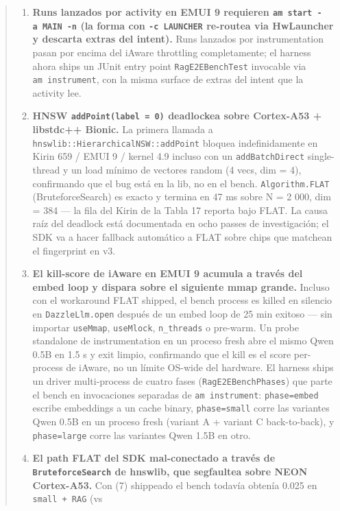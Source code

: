 \begin{quote}
\begin{enumerate}
  re-\texttt{notify} heartbeat de 4 s es el workaround diagnosticado.
\item
  \textbf{Runs lanzados por activity en EMUI 9 requieren
  \texttt{am\ start\ -a\ MAIN\ -n} (la forma con \texttt{-c\ LAUNCHER} re-routea
  via HwLauncher y descarta extras del intent).} Runs lanzados por
  instrumentation pasan por encima del iAware throttling completamente; el
  harness ahora ships un JUnit entry point \texttt{RagE2EBenchTest} invocable
  via \texttt{am\ instrument}, con la misma surface de extras del intent que la
  activity lee.
\item
  \textbf{HNSW \texttt{addPoint(label\ =\ 0)} deadlockea sobre Cortex-A53 +
  libstdc++ Bionic.} La primera llamada a
  \texttt{hnswlib::HierarchicalNSW::addPoint} bloquea indefinidamente en Kirin
  659 / EMUI 9 / kernel 4.9 incluso con un \texttt{addBatchDirect} single-thread
  y un load mínimo de vectores random (4 vecs, dim = 4), confirmando que el bug
  está en la lib, no en el bench. \texttt{Algorithm.FLAT} (BruteforceSearch) es
  exacto y termina en 47 ms sobre N = 2 000, dim = 384 --- la fila del Kirin de
  la Tabla 17 reporta bajo FLAT. La causa raíz del deadlock está documentada en
  ocho passes de investigación; el SDK va a hacer fallback automático a FLAT
  sobre chips que matchean el fingerprint en v3.
\item
  \textbf{El kill-score de iAware en EMUI 9 acumula a través del embed loop y
  dispara sobre el siguiente mmap grande.} Incluso con el workaround FLAT
  shipped, el bench process es killed en silencio en \texttt{DazzleLlm.open}
  después de un embed loop de 25 min exitoso --- sin importar \texttt{useMmap},
  \texttt{useMlock}, \texttt{n\_threads} o pre-warm. Un probe standalone de
  instrumentation en un proceso fresh abre el mismo Qwen 0.5B en 1.5 s y exit
  limpio, confirmando que el kill es el score per-process de iAware, no un
  límite OS-wide del hardware. El harness ships un driver multi-process de
  cuatro fases (\texttt{RagE2EBenchPhases}) que parte el bench en invocaciones
  separadas de \texttt{am\ instrument}: \texttt{phase=embed} escribe embeddings
  a un cache binary, \texttt{phase=small} corre las variantes Qwen 0.5B en un
  proceso fresh (variant A + variant C back-to-back), y \texttt{phase=large}
  corre las variantes Qwen 1.5B en otro.
\item
  \textbf{El path FLAT del SDK mal-conectado a través de
  \texttt{BruteforceSearch} de hnswlib, que segfaultea sobre NEON Cortex-A53.}
  Con (7) shippeado el bench todavía obtenía 0.025 en \texttt{small\ +\ RAG} (vs

\end{enumerate}
\end{quote}
